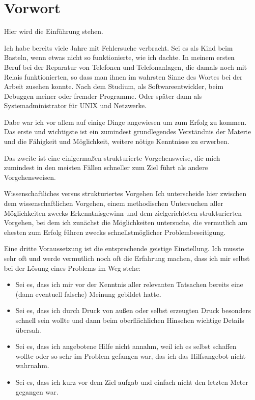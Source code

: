 \chapter{Vorwort}
\label{cha:vorwort}

\begin{abstractsec}
  Hier wird die Einführung stehen.
\end{abstractsec}
\begin{normaltext}
  Ich habe bereits viele Jahre mit Fehlersuche verbracht.
  Sei es als Kind beim Basteln, wenn etwas nicht so funktionierte, wie ich
  dachte. In meinem ersten Beruf bei der Reparatur von Telefonen und
  Telefonanlagen, die damals noch mit Relais funktionierten, so dass man ihnen
  im wahrsten Sinne des Wortes bei der Arbeit zusehen konnte. Nach dem
  Studium, als Softwareentwickler, beim Debuggen meiner oder fremder
  Programme. Oder später dann als Systemadministrator für UNIX und Netzwerke.

  Dabe war ich vor allem auf einige Dinge angewiesen um zum Erfolg zu kommen.
  Das erste und wichtigste ist ein zumindest grundlegendes Verständnis der
  Materie und die Fähigkeit und Möglichkeit, weitere nötige Kenntnisse zu
  erwerben.
  
  Das zweite ist eine einigermaßen strukturierte Vorgehensweise, die
  mich zumindest in den meisten Fällen schneller zum Ziel führt als andere
  Vorgehensweisen.

  \begin{Exkursbox}{Wissenschaftliches versus strukturiertes Vorgehen}
  Ich unterscheide hier zwischen dem wissenschaftlichen Vorgehen, einem
  methodischen Untersuchen aller Möglichkeiten zwecks Erkenntnisgewinn und dem
  zielgerichteten strukturierten Vorgehen, bei dem ich zunächst die
  Möglichkeiten untersuche, die vermutlich am ehesten zum Erfolg führen zwecks
  schnellstmöglicher Problembeseitigung.
  \end{Exkursbox}

  Eine dritte Voraussetzung ist die entsprechende geistige Einstellung. Ich
  musste sehr oft und werde vermutlich noch oft die Erfahrung machen, dass ich
  mir selbst bei der Lösung eines Problems im Weg stehe:

  \begin{itemize}
    \item Sei es, dass ich mir vor der Kenntnis aller relevanten Tatsachen
      bereits eine (dann eventuell falsche) Meinung gebildet hatte.
    \item Sei es, dass ich durch Druck von außen oder selbst erzeugten Druck
      besonders schnell sein wollte und dann beim oberflächlichen Hinsehen
      wichtige Details übersah.
    \item Sei es, dass ich angebotene Hilfe nicht annahm, weil ich es selbst
      schaffen wollte oder so sehr im Problem gefangen war, das ich das
      Hilfsangebot nicht wahrnahm.
    \item Sei es, dass ich kurz vor dem Ziel aufgab und einfach nicht den
      letzten Meter gegangen war.
  \end{itemize}


\end{normaltext}
